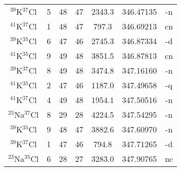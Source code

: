 \begin{table*}[htp]
\begin{tabular}{ccccccc}
$^{39}$K$^{37}$Cl & 5 & 48 & 47 & 2343.3 & 346.47135 & -n \\
$^{41}$K$^{37}$Cl & 1 & 48 & 47 & 797.3 & 346.69213 & cn \\
$^{39}$K$^{35}$Cl & 6 & 47 & 46 & 2745.3 & 346.87334 & -d \\
$^{41}$K$^{35}$Cl & 9 & 49 & 48 & 3851.5 & 346.87813 & cn \\
$^{39}$K$^{37}$Cl & 8 & 49 & 48 & 3474.8 & 347.16160 & -n \\
$^{41}$K$^{35}$Cl & 2 & 47 & 46 & 1187.0 & 347.49658 & -q \\
$^{41}$K$^{37}$Cl & 4 & 49 & 48 & 1954.1 & 347.50516 & -n \\
$^{23}$Na$^{37}$Cl & 8 & 29 & 28 & 4224.5 & 347.54295 & -n \\
$^{39}$K$^{35}$Cl & 9 & 48 & 47 & 3882.6 & 347.60970 & -n \\
$^{39}$K$^{37}$Cl & 1 & 47 & 46 & 794.8 & 347.71265 & -d \\
$^{23}$Na$^{35}$Cl & 6 & 28 & 27 & 3283.0 & 347.90765 & nc \\
\hline
\end{tabular}

\par 
\end{table*}
